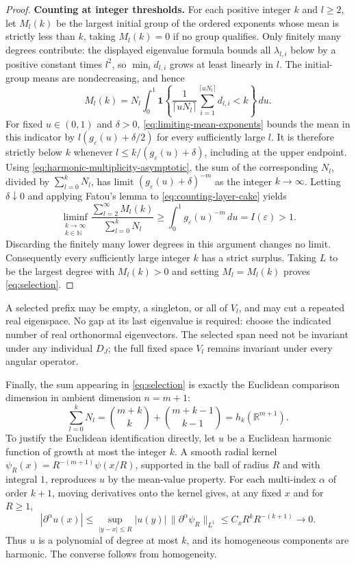 \begin{proof}
\medskip\noindent\textbf{Counting at integer thresholds.}
For each positive integer $k$ and $l\ge2$, let $M_l(k)$ be the largest
initial group of the ordered exponents whose mean is strictly less than
$k$, taking $M_l(k)=0$ if no group qualifies.
Only finitely many degrees contribute: the displayed eigenvalue formula
bounds all $\lambda_{l,i}$ below by a positive constant times $l^2$,
so $\min_i d_{l,i}$ grows at least linearly in $l$.
The initial-group means are nondecreasing, and hence
\begin{equation}\label{eq:counting-layer-cake}
 M_l(k)=N_l\int_0^1
 \mathbf 1\left\{
   \frac1{\lceil uN_l\rceil}
   \sum_{i=1}^{\lceil uN_l\rceil}d_{l,i}<k
 \right\}\,du.
\end{equation}
For fixed $u\in(0,1)$ and $\delta>0$,
\eqref{eq:limiting-mean-exponents} bounds the mean in this indicator by
$l(g_\varepsilon(u)+\delta/2)$ for every sufficiently large $l$.
It is therefore strictly below $k$ whenever
$l\le k/(g_\varepsilon(u)+\delta)$, including at the upper endpoint. Using
\eqref{eq:harmonic-multiplicity-asymptotic}, the sum of the corresponding
$N_l$, divided by $\sum_{l=0}^kN_l$, has limit
$(g_\varepsilon(u)+\delta)^{-m}$ as the integer $k\to\infty$.
Letting $\delta\downarrow0$ and applying Fatou's lemma to
\eqref{eq:counting-layer-cake} yields
\begin{equation}\label{eq:counting-liminf}
 \liminf_{\substack{k\to\infty\\ k\in\mathbb N}}
 \frac{\sum_{l=2}^\infty M_l(k)}{\sum_{l=0}^kN_l}
 \ge\int_0^1g_\varepsilon(u)^{-m}\,du
 =I(\varepsilon)>1.
\end{equation}
Discarding the finitely many lower degrees in this argument changes no
limit. Consequently every sufficiently large integer $k$ has a strict surplus.
Taking $L$ to be the largest degree with $M_l(k)>0$ and setting
$M_l=M_l(k)$ proves \eqref{eq:selection}.
\end{proof}

A selected prefix may be empty, a singleton, or all of \(V_l\), and may
cut a repeated real eigenspace. No gap at its last eigenvalue is required:
choose the indicated number of real orthonormal eigenvectors. The selected
span need not be invariant under any individual \(D_J\); the full fixed
space \(V_l\) remains invariant under every angular operator.

Finally, the sum appearing in \eqref{eq:selection} is exactly the
Euclidean comparison dimension in ambient dimension $n=m+1$:
\[
 \sum_{l=0}^kN_l
 =\binom{m+k}{k}+\binom{m+k-1}{k-1}
 =h_k(\mathbb R^{m+1}).
\]
To justify the Euclidean identification directly, let $u$ be a Euclidean
harmonic function of growth at most the integer $k$. A smooth radial kernel
$\psi_R(x)=R^{-(m+1)}\psi(x/R)$, supported in the ball of radius $R$ and
with integral $1$, reproduces $u$ by the mean-value property. For each
multi-index $\alpha$ of order $k+1$, moving derivatives onto the kernel
gives, at any fixed $x$ and for $R\ge1$,
\[
 |\partial^\alpha u(x)|
 \le \sup_{|y-x|\le R}|u(y)|\,
       \|\partial^\alpha\psi_R\|_{L^1}
 \le C_x R^kR^{-(k+1)}\longrightarrow0.
\]
Thus $u$ is a polynomial of degree at most $k$, and its homogeneous
components are harmonic. The converse follows from homogeneity.

